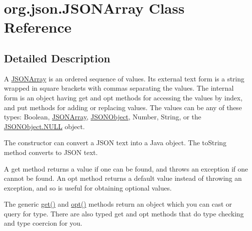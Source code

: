 \hypertarget{classorg_1_1json_1_1JSONArray}{\section{org.\-json.\-J\-S\-O\-N\-Array Class Reference}
\label{classorg_1_1json_1_1JSONArray}
}


\subsection{Detailed Description}
A \hyperlink{classorg_1_1json_1_1JSONArray}{J\-S\-O\-N\-Array} is an ordered sequence of values. Its external text form is a string wrapped in square brackets with commas separating the values. The internal form is an object having {\ttfamily get} and {\ttfamily opt} methods for accessing the values by index, and {\ttfamily put} methods for adding or replacing values. The values can be any of these types\-: {\ttfamily Boolean}, {\ttfamily \hyperlink{classorg_1_1json_1_1JSONArray}{J\-S\-O\-N\-Array}}, {\ttfamily \hyperlink{classorg_1_1json_1_1JSONObject}{J\-S\-O\-N\-Object}}, {\ttfamily Number}, {\ttfamily String}, or the {\ttfamily \hyperlink{classorg_1_1json_1_1JSONObject_a01c74a31a1abfd34ab13beb9347855ac}{J\-S\-O\-N\-Object.\-N\-U\-L\-L} object}. 

The constructor can convert a J\-S\-O\-N text into a Java object. The {\ttfamily to\-String} method converts to J\-S\-O\-N text. 

A {\ttfamily get} method returns a value if one can be found, and throws an exception if one cannot be found. An {\ttfamily opt} method returns a default value instead of throwing an exception, and so is useful for obtaining optional values. 

The generic {\ttfamily \hyperlink{classorg_1_1json_1_1JSONArray_a3a8413753f53e0c0a5e008816c915eae}{get()}} and {\ttfamily \hyperlink{classorg_1_1json_1_1JSONArray_a19aa83c80cded3d0a252c212ceca7954}{opt()}} methods return an object which you can cast or query for type. There are also typed {\ttfamily get} and {\ttfamily opt} methods that do type checking and type coercion for you. 

